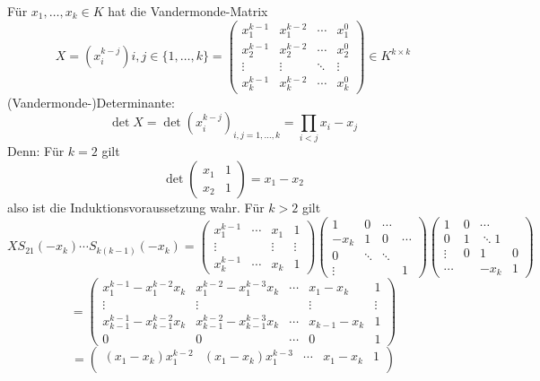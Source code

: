 	\begin{Definition}
		Für $ x_1,\dots, x_k\in K $ hat die Vandermonde-Matrix
			\[ X= (x_i^{k-j})i,j\in \{1,\dots, k \} =
				\begin{pmatrix}
					x_1^{k-1}&x_1^{k-2}&\cdots & x_1^0\\
					x_2^{k-1}&x_2^{k-2}&\cdots & x_2^0\\
					\vdots & \vdots & \ddots&\vdots \\
					x_k^{k-1}&x_k^{k-2}&\cdots & x_k^0
				\end{pmatrix} \in K^{k\times k}\]
		(Vandermonde-)Determinante:
			\[ \det X = \det (x_i^{k-j})_{i,j = 1,\dots, k} = \prod_{i<j}x_i-x_j \]
		Denn: Für $ k=2 $ gilt
			\[ \det \begin{pmatrix}
				x_1&1\\x_2&1
			\end{pmatrix} = x_1-x_2\]
		also ist die Induktionsvoraussetzung wahr. Für $ k>2 $ gilt
			\[ XS_{21}(-x_k)\cdots S_{k(k-1)}(-x_k) = 
			\begin{pmatrix}
				x_1^{k-1} &\cdots & x_1 & 1\\
				\vdots & & \vdots & \vdots\\
				x_k^{k-1} & \cdots & x_k & 1
			\end{pmatrix}\begin{pmatrix}
				1 & 0 & \cdots & \\
				-x_k & 1 & 0 & \cdots\\
				0 & \ddots & \ddots & \\
				\vdots & & & 1
			\end{pmatrix}\begin{pmatrix}
			1 & 0 & \cdots & \\
			0 & 1& \ddots1&\\
			\vdots & 0 &1 & 0 \\
			\cdots & & -x_k & 1			
			\end{pmatrix}\]
			\[ = \begin{pmatrix}
			x_1^{k-1}-x_1^{k-2}x_k & x_1^{k-2}-x_1^{k-3}x_k & \cdots & x_1-x_k & 1 \\ 
			\vdots & \vdots &  & \vdots & \vdots \\ 
			x_{k-1}^{k-1}-x_{k-1}^{k-2}x_k & x_{k-1}^{k-2}-x_{k-1}^{k-3}x_k & \cdots & x_{k-1}-x_k & 1 \\ 
			0 & 0 & \cdots & 0 & 1
			\end{pmatrix}  \]
			\[ = \begin{pmatrix}
			(x_1-x_k)x_1^{k-2} & (x_1-x_k)x_1^{k-3} & \cdots & x_1-x_k & 1 \\ 

\end{pmatrix}\]
\end{Definition}
